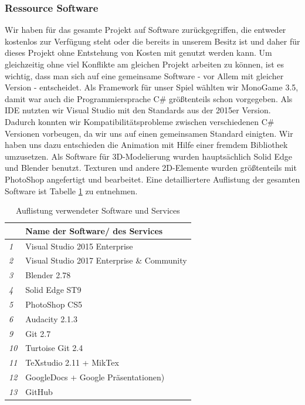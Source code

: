 \documentclass[10pt]{article}
\begin{document}
\subsubsection{Ressource Software}
Wir haben für das gesamte Projekt auf Software zurückgegriffen, die entweder kostenlos zur Verfügung steht oder die bereits in unserem Besitz ist und daher für dieses Projekt ohne Entstehung von Kosten mit genutzt werden kann.\newline
Um gleichzeitig ohne viel Konflikte am gleichen Projekt arbeiten zu können, ist es wichtig, dass man sich auf eine gemeinsame Software - vor Allem mit gleicher Version - entscheidet. \newline
Als Framework für unser Spiel wählten wir MonoGame 3.5, damit war auch die Programmiersprache C\# größtenteils schon vorgegeben. Als IDE nutzten wir Visual Studio mit den Standards aus der 2015er Version.
Dadurch konnten wir Kompatibilitätsprobleme zwischen verschiedenen C\# Versionen vorbeugen, da wir uns auf einen gemeinsamen Standard einigten.
Wir haben uns dazu entschieden die Animation mit Hilfe einer fremdem Bibliothek umzusetzen. \newline
Als Software für 3D-Modelierung wurden hauptsächlich Solid Edge und Blender benutzt. Texturen und andere 2D-Elemente wurden größtenteils mit PhotoShop angefertigt und bearbeitet.
Eine detailliertere Auflistung der gesamten Software ist Tabelle \ref{tbl:software} zu entnehmen.
\begin{table}[H]
\centering
	\begin{tabular}{p{0.5cm}p{9cm}}
		\textbf{ }  & \textbf{Name der Software/ des Services} \\
		\hline
		\textit{1}          & \textnormal{Visual Studio 2015 Enterprise}            \\
		\textit{2}          & \textnormal{Visual Studio 2017 Enterprise \& Community}            \\
		\textit{3}          & \textnormal{Blender 2.78}            \\
		\textit{4}          & \textnormal{Solid Edge ST9}            \\
		\textit{5}          & \textnormal{PhotoShop CS5}            \\
		\textit{6}          & \textnormal{Audacity 2.1.3}            \\
		\textit{9}          & \textnormal{Git 2.7}  \\
		\textit{10}          & \textnormal{Turtoise Git 2.4}            \\
		\textit{11}          & \textnormal{TeXstudio 2.11 + MikTex}       \\
		\textit{12}          & \textnormal{GoogleDocs + Google Präsentationen)}  \\
		\textit{13}          & \textnormal{GitHub}  \\
		\hline
	\end{tabular}
	\caption{Auflistung verwendeter Software und Services}	
	\label{tbl:software}	
\end{table}
\end{document}
